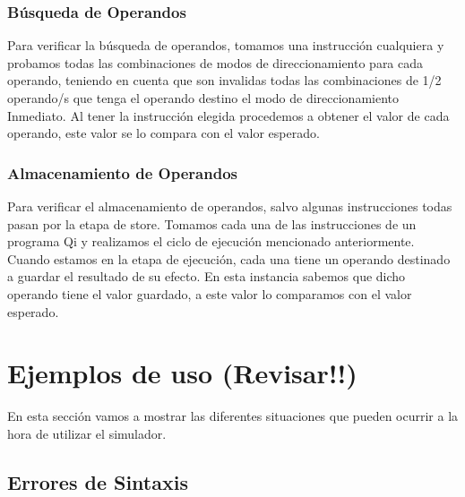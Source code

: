 \subsubsection{Búsqueda de Operandos}

Para verificar la búsqueda de operandos, tomamos una instrucción cualquiera y probamos todas las combinaciones de modos de direccionamiento para cada operando, teniendo en cuenta que son invalidas todas las combinaciones de 1/2 operando/s que tenga el operando destino el modo de direccionamiento Inmediato. Al tener la instrucción elegida procedemos a obtener el valor de cada operando, este valor se lo compara con el valor esperado. 
 
\subsubsection{Almacenamiento de Operandos}

Para verificar el almacenamiento de operandos, salvo algunas instrucciones todas pasan por la etapa de store.
Tomamos cada una de las instrucciones de un programa Qi y realizamos el ciclo de ejecución mencionado anteriormente.
Cuando estamos en la etapa de ejecución, cada una tiene un operando destinado a guardar el resultado de su efecto.
En esta instancia sabemos que  dicho operando tiene el valor guardado, a este valor lo comparamos con el valor esperado.

\section{Ejemplos de uso (Revisar!!)}

En esta sección vamos a mostrar las diferentes situaciones que pueden ocurrir a la hora de utilizar el simulador.

\subsection{Errores de Sintaxis} 

